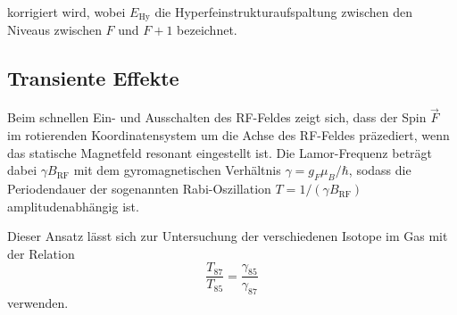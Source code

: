   korrigiert wird, wobei $E_\text{Hy}$ die Hyperfeinstrukturaufspaltung zwischen den Niveaus zwischen $F$ und $F+1$ bezeichnet.

  \subsection{Transiente Effekte}
  \label{subsec:transient}
  Beim schnellen Ein- und Ausschalten des RF-Feldes zeigt sich, dass der Spin $\vec{F}$ im rotierenden Koordinatensystem um die Achse des RF-Feldes präzediert, wenn das statische Magnetfeld resonant eingestellt ist. Die Lamor-Frequenz beträgt dabei $\gamma B_{\text{RF}}$ mit dem gyromagnetischen Verhältnis $\gamma = g_F \mu_B/\hbar$, sodass die Periodendauer der sogenannten Rabi-Oszillation $T=1/(\gamma B_\text{RF})$ amplitudenabhängig ist.

  Dieser Ansatz lässt sich zur Untersuchung der verschiedenen Isotope im Gas mit der Relation
  \begin{equation}
    \frac{T_{87}}{T_{85}} = \frac{\gamma_{85}}{\gamma_{87}}
    \label{eqn:transient}
  \end{equation}
  verwenden.
